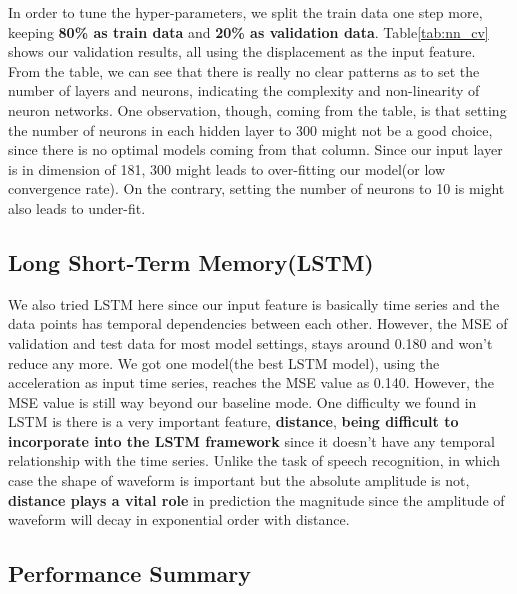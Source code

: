 \documentclass{article} %
\begin{document}
In order to tune the hyper-parameters, we split the train data one step more, keeping \textbf{80\% as train data} and \textbf{20\% as validation data}. Table\ref{tab:nn_cv} shows our validation results, all using the displacement as the input feature. From the table, we can see that there is really no clear patterns as to set the number of layers and neurons, indicating the complexity and non-linearity of neuron networks. One observation, though, coming from the table, is that setting the number of neurons in each hidden layer to 300 might not be a good choice, since there is no optimal models coming from that column. Since our input layer is in dimension of 181, 300 might leads to over-fitting our model(or low convergence rate). On the contrary, setting the number of neurons to 10 is might also leads to under-fit.

\subsection{Long Short-Term Memory(LSTM)}
We also tried LSTM here since our input feature is basically time series and the data points has temporal dependencies between each other. However, the MSE of validation and test data for most model settings, stays around 0.180 and won't reduce any more. We got one model(the best LSTM model), using the acceleration as input time series, reaches the MSE value as 0.140. However, the MSE value is still way beyond our baseline mode. One difficulty we found in LSTM is there is a very important feature, \textbf{distance}, \textbf{being difficult to incorporate into the LSTM framework} since it doesn't have any temporal relationship with the time series. Unlike the task of speech recognition, in which case the shape of waveform is important but the absolute amplitude is not, \textbf{distance plays a vital role} in prediction the magnitude since the amplitude of waveform will decay in exponential order with distance.


\subsection{Performance Summary}
\end{document}
